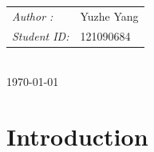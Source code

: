 \documentclass[12pt,a4paper]{report}
\begin{document}
\begin{titlepage}

    \begin{minipage}{0.4\textwidth}
        \begin{tabular}{l l}
            \emph{Author :\quad}     &   Yuzhe Yang     \\
            \emph{Student ID:\quad} &  121090684\\
        \end{tabular}

    \end{minipage}\\[2cm]


    {\large \today}\\[2cm]
    \vfill
\end{titlepage}


\newpage



\pagestyle{mypagestyle}


\section{Introduction}
\end{document}
